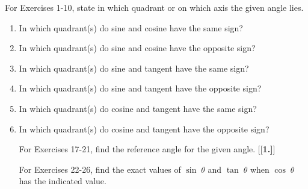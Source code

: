 \startexercises\label{sec1dot4}
\vspace{4mm}
{\small
\par\noindent For Exercises 1-10, state in which quadrant or on which axis the given angle lies.
\begin{enumerate}[\bfseries 1.]
 \item In which quadrant(s) do sine and cosine have the same sign?
 \item In which quadrant(s) do sine and cosine have the opposite sign?
 \item In which quadrant(s) do sine and tangent have the same sign?
 \item In which quadrant(s) do sine and tangent have the opposite sign?
 \item In which quadrant(s) do cosine and tangent have the same sign?
 \item In which quadrant(s) do cosine and tangent have the opposite sign?
\par\noindent For Exercises 17-21, find the reference angle for the given angle.
[{[\bfseries 1.]}]
\par\noindent For Exercises 22-26, find the exact values of $\sin\;\theta$ and $\tan\;\theta$ when
$\cos\;\theta$ has the indicated value.

\end{enumerate}}
